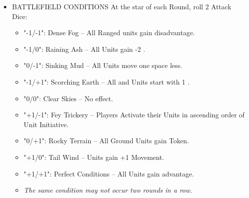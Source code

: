 \begin{multicols*}{2}
\begin{itemize}
  \item \MakeUppercase{Battlefield Conditions} At the star of each Round, roll 2 Attack Dice: %
  \begin{itemize}
    \item "-1/-1": Dense Fog -- All Ranged units gain disadvantage.
    \item "-1/0": Raining Ash -- All  Units gain -2 . %
    \item "0/-1": Sinking Mud -- All  Units move one space less.
    \item "-1/+1": Scorching Earth -- All  and  Units start with 1 .
    \item "0/0": Clear Skies -- No effect. %
    \item "+1/-1": Fey Trickery -- Players Activate their Units in ascending order of Unit Initiative. %
    \item "0/+1": Rocky Terrain -- All Ground Units gain  Token.
    \item "+1/0": Tail Wind --  Units gain +1 Movement.
    \item "+1/+1": Perfect Conditions -- All  Units gain advantage. %
    \item \textit{The same condition may not occur two rounds in a row.}
  \end{itemize} %
  

\end{itemize}
\end{multicols*}
